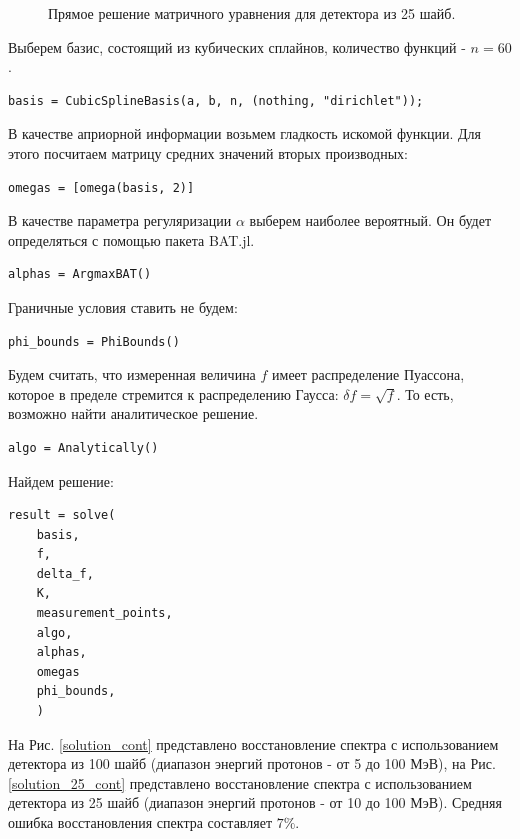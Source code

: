 \documentclass{config}
\begin{document}
\begin{figure}[h]
\begin{minipage}[h]{0.5\linewidth}
    \caption{Прямое решение матричного уравнения для детектора из 25 шайб.}
    \label{simple_solution_25}
\end{minipage}
\end{figure}

Выберем базис, состоящий из кубических сплайнов, количество функций - $n=60$.
\begin{verbatim}
basis = CubicSplineBasis(a, b, n, (nothing, "dirichlet"));
\end{verbatim}
В качестве априорной информации возьмем гладкость искомой функции. Для этого посчитаем матрицу средних значений вторых производных:
\begin{verbatim}
omegas = [omega(basis, 2)]
\end{verbatim}
В качестве параметра регуляризации $\alpha$ выберем наиболее вероятный. Он будет определяться с помощью пакета BAT.jl.
\begin{verbatim}
alphas = ArgmaxBAT()
\end{verbatim}
Граничные условия ставить не будем:
\begin{verbatim}
phi_bounds = PhiBounds()
\end{verbatim}
Будем считать, что измеренная величина $f$ имеет распределение Пуассона, которое в пределе стремится к распределению Гаусса: $\delta f = \sqrt{f}$. То есть, возможно найти аналитическое решение.
\begin{verbatim}
algo = Analytically()
\end{verbatim}
Найдем решение:
\begin{verbatim}
result = solve(
    basis,
    f,
    delta_f,
    K,
    measurement_points,
    algo,
    alphas,
    omegas
    phi_bounds,
    )
\end{verbatim}


На Рис. \ref{solution_cont} представлено восстановление спектра с использованием детектора из 100 шайб (диапазон энергий протонов - от 5 до 100 МэВ), на Рис. \ref{solution_25_cont} представлено восстановление спектра с использованием детектора из 25 шайб (диапазон энергий протонов - от 10 до 100 МэВ). Средняя ошибка восстановления спектра составляет $7\%$.
\end{document}

